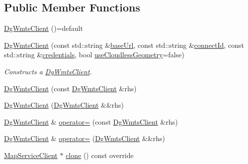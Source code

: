 \subsection*{Public Member Functions}
\begin{DoxyCompactItemize}
\item 
\hyperlink{classdg_1_1deepcore_1_1imagery_1_1_dg_wmts_client_acb37552b359fc2785d060987471cb9d6}{Dg\+Wmts\+Client} ()=default
\item 
\hyperlink{classdg_1_1deepcore_1_1imagery_1_1_dg_wmts_client_a080a9c2664a66bccee9b36ffd411085c}{Dg\+Wmts\+Client} (const std\+::string \&\hyperlink{group___imagery_module_gadf279770cec6dc9ac56348bb2e1b29e1}{base\+Url}, const std\+::string \&\hyperlink{classdg_1_1deepcore_1_1imagery_1_1_dg_wmts_client_aaa23928355c68c5422a5aab297d64f99}{connect\+Id}, const std\+::string \&\hyperlink{group___imagery_module_gac4c03ea635c336ca2fe7de533706c11c}{credentials}, bool \hyperlink{classdg_1_1deepcore_1_1imagery_1_1_dg_wmts_client_a718ef987832eb1d5bbab510c6ef7b70c}{use\+Cloudless\+Geometry}=false)
\begin{DoxyCompactList}\small\item\em Constructs a \hyperlink{classdg_1_1deepcore_1_1imagery_1_1_dg_wmts_client}{Dg\+Wmts\+Client}. \end{DoxyCompactList}\item 
\hyperlink{classdg_1_1deepcore_1_1imagery_1_1_dg_wmts_client_a869c53fbba99c97c84aaf1a4c7958bdc}{Dg\+Wmts\+Client} (const \hyperlink{classdg_1_1deepcore_1_1imagery_1_1_dg_wmts_client}{Dg\+Wmts\+Client} \&rhs)
\item 
\hyperlink{classdg_1_1deepcore_1_1imagery_1_1_dg_wmts_client_a5b15c3c9c85e82c782fa90f2f8d7962f}{Dg\+Wmts\+Client} (\hyperlink{classdg_1_1deepcore_1_1imagery_1_1_dg_wmts_client}{Dg\+Wmts\+Client} \&\&rhs)
\item 
\hyperlink{classdg_1_1deepcore_1_1imagery_1_1_dg_wmts_client}{Dg\+Wmts\+Client} \& \hyperlink{classdg_1_1deepcore_1_1imagery_1_1_dg_wmts_client_a9e90fdc4fa6d6a6bf8a16c384bdd7041}{operator=} (const \hyperlink{classdg_1_1deepcore_1_1imagery_1_1_dg_wmts_client}{Dg\+Wmts\+Client} \&rhs)
\item 
\hyperlink{classdg_1_1deepcore_1_1imagery_1_1_dg_wmts_client}{Dg\+Wmts\+Client} \& \hyperlink{classdg_1_1deepcore_1_1imagery_1_1_dg_wmts_client_a8abcf76a3bc198eda3a457541109b9ce}{operator=} (\hyperlink{classdg_1_1deepcore_1_1imagery_1_1_dg_wmts_client}{Dg\+Wmts\+Client} \&\&rhs)
\item 
\hyperlink{classdg_1_1deepcore_1_1imagery_1_1_map_service_client}{Map\+Service\+Client} $\ast$ \hyperlink{classdg_1_1deepcore_1_1imagery_1_1_dg_wmts_client_a5b788d2ffccd50c992f8cf16daa37756}{clone} () const override

\end{DoxyCompactItemize}
